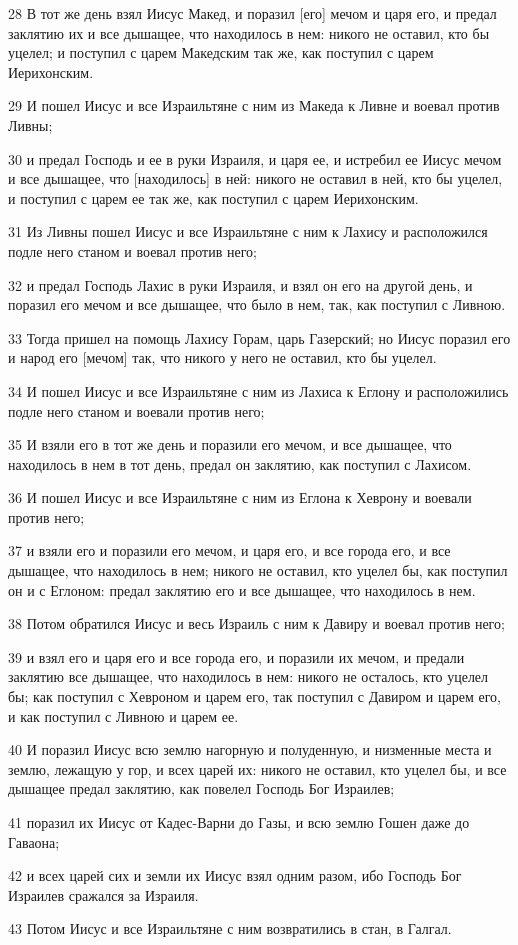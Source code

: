 \par 28 В тот же день взял Иисус Макед, и поразил [его] мечом и царя его, и предал заклятию их и все дышащее, что находилось в нем: никого не оставил, кто бы уцелел; и поступил с царем Македским так же, как поступил с царем Иерихонским.
\par 29 И пошел Иисус и все Израильтяне с ним из Македа к Ливне и воевал против Ливны;
\par 30 и предал Господь и ее в руки Израиля, и царя ее, и истребил ее Иисус мечом и все дышащее, что [находилось] в ней: никого не оставил в ней, кто бы уцелел, и поступил с царем ее так же, как поступил с царем Иерихонским.
\par 31 Из Ливны пошел Иисус и все Израильтяне с ним к Лахису и расположился подле него станом и воевал против него;
\par 32 и предал Господь Лахис в руки Израиля, и взял он его на другой день, и поразил его мечом и все дышащее, что было в нем, так, как поступил с Ливною.
\par 33 Тогда пришел на помощь Лахису Горам, царь Газерский; но Иисус поразил его и народ его [мечом] так, что никого у него не оставил, кто бы уцелел.
\par 34 И пошел Иисус и все Израильтяне с ним из Лахиса к Еглону и расположились подле него станом и воевали против него;
\par 35 И взяли его в тот же день и поразили его мечом, и все дышащее, что находилось в нем в тот день, предал он заклятию, как поступил с Лахисом.
\par 36 И пошел Иисус и все Израильтяне с ним из Еглона к Хеврону и воевали против него;
\par 37 и взяли его и поразили его мечом, и царя его, и все города его, и все дышащее, что находилось в нем; никого не оставил, кто уцелел бы, как поступил он и с Еглоном: предал заклятию его и все дышащее, что находилось в нем.
\par 38 Потом обратился Иисус и весь Израиль с ним к Давиру и воевал против него;
\par 39 и взял его и царя его и все города его, и поразили их мечом, и предали заклятию все дышащее, что находилось в нем: никого не осталось, кто уцелел бы; как поступил с Хевроном и царем его, так поступил с Давиром и царем его, и как поступил с Ливною и царем ее.
\par 40 И поразил Иисус всю землю нагорную и полуденную, и низменные места и землю, лежащую у гор, и всех царей их: никого не оставил, кто уцелел бы, и все дышащее предал заклятию, как повелел Господь Бог Израилев;
\par 41 поразил их Иисус от Кадес-Варни до Газы, и всю землю Гошен даже до Гаваона;
\par 42 и всех царей сих и земли их Иисус взял одним разом, ибо Господь Бог Израилев сражался за Израиля.
\par 43 Потом Иисус и все Израильтяне с ним возвратились в стан, в Галгал.

